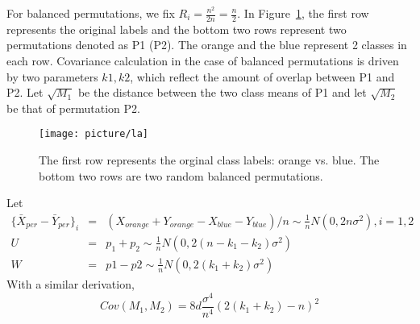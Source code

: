\documentclass[12pt]{article}
\begin{document}
\begin{appendices}
For balanced permutations, we fix $R_i=\frac{n^2}{2n}=\frac{n}{2}$. In Figure~\ref{perp}, the first row represents the original labels and the bottom two rows represent two permutations denoted as P1 (P2). The orange and the blue represent 2 classes in each row. Covariance calculation in the case of balanced permutations is driven by two parameters $k1, k2$, which reflect the amount of overlap between P1 and P2. Let $\sqrt{M_1}$ be the distance between the two class means of P1 and let $\sqrt{M_2}$ be that of permutation P2. 
\begin{figure}%
  \centering
  \texttt{[image: picture/la]}\\
  \caption{The first row represents the orginal class labels: orange vs. blue. The bottom two rows are two random balanced permutations. }
  \label{perp}
\end{figure}
Let
\begin{eqnarray*}
\{\bar X_{per}-\bar Y_{per}\}_i&=&(X_{orange}+Y_{orange}-X_{blue}-Y_{blue})/n\sim \frac{1}{n}N(0, 2n\sigma^2), i=1, 2\\
U&=&p_1+p_2\sim \frac{1}{n}N(0, 2(n-k_1-k_2)\sigma^2)\\
W&=&p1-p2\sim \frac{1}{n}N(0, 2(k_1+k_2)\sigma^2)
\end{eqnarray*}
With a similar derivation, 
$$Cov(M_1, M_2)=8d\frac{\sigma^4}{n^4}(2(k_1+k_2)-n)^2$$



\end{appendices}
\end{document}
